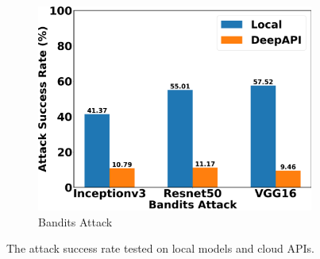 \begin{figure}[bth]
\begin{subfigure}[b]{0.31\textwidth}
    \centering
    \includegraphics[width=\textwidth]{figures/chapter_classification/bandits_attack_success_rate.png}
    \caption{Bandits Attack}
    \label{fig:bandits_suc}
\end{subfigure}
\caption{The attack success rate tested on local models and cloud APIs.}
\label{fig.suc}
\end{figure}

